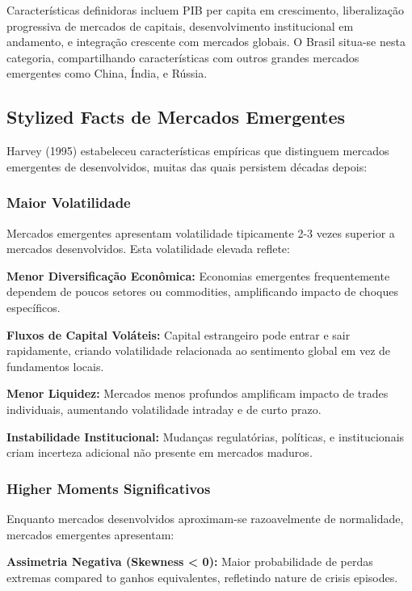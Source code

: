 Características definidoras incluem PIB per capita em crescimento, liberalização progressiva de mercados de capitais, desenvolvimento institucional em andamento, e integração crescente com mercados globais. O Brasil situa-se nesta categoria, compartilhando características com outros grandes mercados emergentes como China, Índia, e Rússia.

\subsection{Stylized Facts de Mercados Emergentes}

Harvey (1995) estabeleceu características empíricas que distinguem mercados emergentes de desenvolvidos, muitas das quais persistem décadas depois:

\subsubsection{Maior Volatilidade}

Mercados emergentes apresentam volatilidade tipicamente 2-3 vezes superior a mercados desenvolvidos. Esta volatilidade elevada reflete:

\textbf{Menor Diversificação Econômica:} Economias emergentes frequentemente dependem de poucos setores ou commodities, amplificando impacto de choques específicos.

\textbf{Fluxos de Capital Voláteis:} Capital estrangeiro pode entrar e sair rapidamente, criando volatilidade relacionada ao sentimento global em vez de fundamentos locais.

\textbf{Menor Liquidez:} Mercados menos profundos amplificam impacto de trades individuais, aumentando volatilidade intraday e de curto prazo.

\textbf{Instabilidade Institucional:} Mudanças regulatórias, políticas, e institucionais criam incerteza adicional não presente em mercados maduros.

\subsubsection{Higher Moments Significativos}

Enquanto mercados desenvolvidos aproximam-se razoavelmente de normalidade, mercados emergentes apresentam:

\textbf{Assimetria Negativa (Skewness < 0):} Maior probabilidade de perdas extremas compared to ganhos equivalentes, refletindo nature de crisis episodes.

